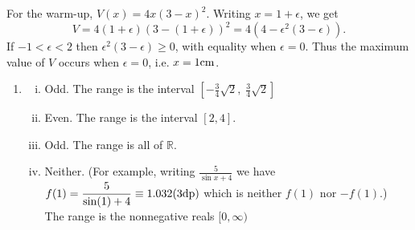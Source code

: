 %

For the warm-up, $V(x)=4x(3-x)^2$. Writing $x=1+\epsilon$, we get
$$V = 4(1 +\epsilon)(3- (1+\epsilon))^2=4(4-\epsilon^2(3-\epsilon)).$$
If $-1<\epsilon<2$ then $\epsilon^2 (3-\epsilon)\ge 0$, with equality when $\epsilon=0$. Thus the maximum
value of $V$ occurs when $\epsilon= 0$, i.e. $x = 1\rm{cm}$.

\begin{enumerate}
\item 
\begin{enumerate}[(i)]
\item Odd. The range is the interval  $[-\frac{3}{4}\sqrt{2},\; \frac{3}{4}\sqrt{2}]$
\item Even. The range is the interval $[2, 4]$.
\item Odd. The range is all of $\mathbb R$.
\item Neither. (For example, writing $\displaystyle \frac{5}{\sin x+4}$ we have $\displaystyle f(1)= \frac{5}{\sin (1)+4} \equiv 1.032 (3\rm{dp})$ which is neither $f(1)$ nor $-f(1)$.)\\[4mm]
The range is the nonnegative reals $[0,\infty)$

\end{enumerate}
\end{enumerate}

